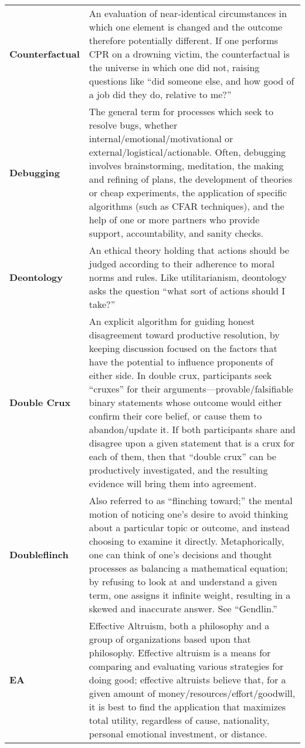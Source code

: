 \begin{longtable} { p{} p{} }
\textbf{Counterfactual} & An evaluation of near-identical circumstances in which one element is changed and the outcome therefore potentially different.  If one performs CPR on a drowning victim, the counterfactual is the universe in which one did not, raising questions like ``did someone else, and how good of a job did they do, relative to me?''\\

\textbf{Debugging} & The general term for processes which seek to resolve bugs, whether internal/emotional/motivational or external/logistical/actionable.  Often, debugging involves brainstorming, meditation, the making and refining of plans, the development of theories or cheap experiments, the application of specific algorithms (such as CFAR techniques), and the help of one or more partners who provide support, accountability, and sanity checks.\\

\textbf{Deontology} & An ethical theory holding that actions should be judged according to their adherence to moral norms and rules.  Like utilitarianism, deontology asks the question ``what sort of actions should I take?''\\

\textbf{Double Crux} & An explicit algorithm for guiding honest disagreement toward productive resolution, by keeping discussion focused on the factors that have the potential to influence proponents of either side.  In double crux, participants seek ``cruxes'' for their arguments---provable/falsifiable binary statements whose outcome would either confirm their core belief, or cause them to abandon/update it.  If both participants share and disagree upon a given statement that is a crux for each of them, then that ``double crux'' can be productively investigated, and the resulting evidence will bring them into agreement.\\

\textbf{Doubleflinch} & Also referred to as ``flinching toward;'' the mental motion of noticing one's desire to avoid thinking about a particular topic or outcome, and instead choosing to examine it directly.  Metaphorically, one can think of one's decisions and thought processes as balancing a mathematical equation; by refusing to look at and understand a given term, one assigns it infinite weight, resulting in a skewed and inaccurate answer.  See ``Gendlin.''\\

\textbf{EA} & Effective Altruism, both a philosophy and a group of organizations based upon that philosophy.  Effective altruism is a means for comparing and evaluating various strategies for doing good; effective altruists believe that, for a given amount of money/resources/effort/goodwill, it is best to find the application that maximizes total utility, regardless of cause, nationality, personal emotional investment, or distance.\\


\end{longtable}
